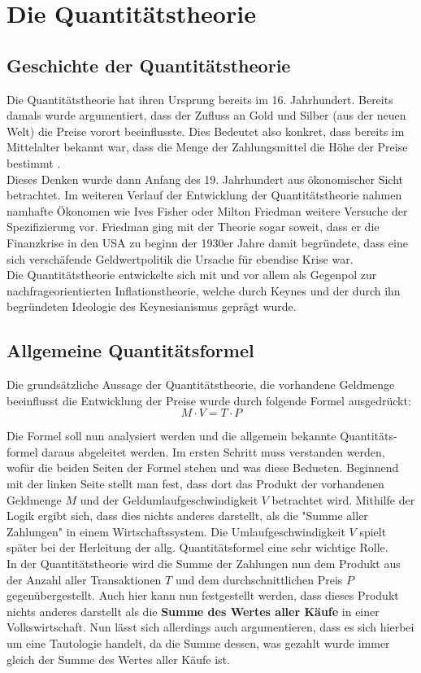 \chapter{Die Quantitätstheorie}

\section{Geschichte der Quantitätstheorie}
Die Quantitätstheorie hat ihren Ursprung bereits im 16. Jahrhundert. Bereits damals wurde argumentiert, dass der Zufluss an Gold und Silber (aus der neuen Welt) die Preise vorort beeinflusste. Dies Bedeutet also konkret, dass bereits im Mittelalter bekannt war, dass die Menge der Zahlungsmittel die Höhe der Preise bestimmt \autocite{Woll1977}. \\
Dieses Denken wurde dann Anfang des 19. Jahrhundert aus ökonomischer Sicht betrachtet. Im weiteren Verlauf der Entwicklung der Quantitätstheorie nahmen namhafte Ökonomen wie Ives Fisher oder Milton Friedman weitere Versuche der Spezifizierung vor. Friedman ging mit der Theorie sogar soweit, dass er die Finanzkrise in den USA zu beginn der 1930er Jahre damit begründete, dass eine sich verschäfende Geldwertpolitik die Ursache für ebendise Krise war. \\
Die Quantitätstheorie entwickelte sich mit und vor allem als Gegenpol zur nachfrageorientierten Inflationstheorie, welche durch Keynes und der durch ihn begründeten Ideologie des Keynesianismus geprägt wurde.

\section{Allgemeine Quantitätsformel}

Die grundsätzliche Aussage der Quantitätstheorie, die vorhandene Geldmenge beeinflusst die Entwicklung der Preise wurde durch folgende Formel ausgedrückt:
$$ M \cdot V = T \cdot P$$\label{allg. Q-Formel}

Die Formel soll nun analysiert werden und die allgemein bekannte Quantitäts-formel daraus abgeleitet werden. Im ersten Schritt muss verstanden werden, wofür die beiden Seiten der Formel stehen und was diese Bedueten. 
Beginnend mit der linken Seite stellt man fest, dass dort das Produkt der vorhandenen Geldmenge $M$ und der Geldumlaufgeschwindigkeit $V$ betrachtet wird. Mithilfe der Logik ergibt sich, dass dies nichts anderes darstellt, als die "Summe aller Zahlungen" in einem Wirtschaftssystem. Die Umlaufgeschwindigkeit $V$ spielt später bei der Herleitung der allg. Quantitätsformel eine sehr wichtige Rolle. \\
In der Quantitätstheorie wird die Summe der Zahlungen nun dem Produkt aus der Anzahl aller Transaktionen $T$ und dem durchschnittlichen Preis $P$ gegenübergestellt. Auch hier kann nun festgestellt werden, dass dieses Produkt nichts anderes darstellt als die \textbf{Summe des Wertes aller Käufe} in einer Volkswirtschaft. Nun lässt sich allerdings auch argumentieren, dass es sich hierbei um eine Tautologie handelt, da die Summe dessen, was gezahlt wurde immer gleich der Summe des Wertes aller Käufe ist.

